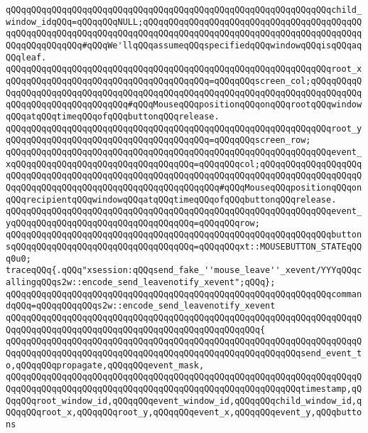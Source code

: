 \verb|qQQqqQQqqQQqqQQqqQQqqQQqqQQqqQQqqQQqqQQqqQQqqQQqqQQqqQQqqQQqqQQqchild_window_idqQQq=qQQqqQQqNULL;qQQqqQQqqQQqqQQqqQQqqQQqqQQqqQQqqQQqqQQqqQQqqQQqqQQqqQQqqQQqqQQqqQQqqQQqqQQqqQQqqQQqqQQqqQQqqQQqqQQqqQQqqQQqqQQqqQQqqQQqqQQqqQQq#qQQqWe'llqQQqassumeqQQqspecifiedqQQqwindowqQQqisqQQqaqQQqleaf.|\newline
\verb|qQQqqQQqqQQqqQQqqQQqqQQqqQQqqQQqqQQqqQQqqQQqqQQqqQQqqQQqqQQqqQQqroot_xqQQqqQQqqQQqqQQqqQQqqQQqqQQqqQQqqQQqqQQq=qQQqqQQqscreen_col;qQQqqQQqqQQqqQQqqQQqqQQqqQQqqQQqqQQqqQQqqQQqqQQqqQQqqQQqqQQqqQQqqQQqqQQqqQQqqQQqqQQqqQQqqQQqqQQqqQQqqQQq#qQQqMouseqQQqpositionqQQqonqQQqrootqQQqwindowqQQqatqQQqtimeqQQqofqQQqbuttonqQQqrelease.|\newline
\verb|qQQqqQQqqQQqqQQqqQQqqQQqqQQqqQQqqQQqqQQqqQQqqQQqqQQqqQQqqQQqqQQqroot_yqQQqqQQqqQQqqQQqqQQqqQQqqQQqqQQqqQQqqQQq=qQQqqQQqscreen_row;|\newline
\verb|qQQqqQQqqQQqqQQqqQQqqQQqqQQqqQQqqQQqqQQqqQQqqQQqqQQqqQQqqQQqqQQqevent_xqQQqqQQqqQQqqQQqqQQqqQQqqQQqqQQqqQQq=qQQqqQQqcol;qQQqqQQqqQQqqQQqqQQqqQQqqQQqqQQqqQQqqQQqqQQqqQQqqQQqqQQqqQQqqQQqqQQqqQQqqQQqqQQqqQQqqQQqqQQqqQQqqQQqqQQqqQQqqQQqqQQqqQQqqQQqqQQqqQQq#qQQqMouseqQQqpositionqQQqonqQQqrecipientqQQqwindowqQQqatqQQqtimeqQQqofqQQqbuttonqQQqrelease.|\newline
\verb|qQQqqQQqqQQqqQQqqQQqqQQqqQQqqQQqqQQqqQQqqQQqqQQqqQQqqQQqqQQqqQQqevent_yqQQqqQQqqQQqqQQqqQQqqQQqqQQqqQQqqQQq=qQQqqQQqrow;|\newline
\verb|qQQqqQQqqQQqqQQqqQQqqQQqqQQqqQQqqQQqqQQqqQQqqQQqqQQqqQQqqQQqqQQqbuttonsqQQqqQQqqQQqqQQqqQQqqQQqqQQqqQQqqQQq=qQQqqQQqxt::MOUSEBUTTON_STATEqQQq0u0;|\newline
\newline
\verb|traceqQQq{.qQQq"xsession:qQQqsend_fake_''mouse_leave''_xevent/YYYqQQqcallingqQQqs2w::encode_send_leavenotify_xevent";qQQq};|\newline
\verb|qQQqqQQqqQQqqQQqqQQqqQQqqQQqqQQqqQQqqQQqqQQqqQQqqQQqqQQqqQQqqQQqcommandqQQq=qQQqqQQqqQQqs2w::encode_send_leavenotify_xevent|\newline
\verb|qQQqqQQqqQQqqQQqqQQqqQQqqQQqqQQqqQQqqQQqqQQqqQQqqQQqqQQqqQQqqQQqqQQqqQQqqQQqqQQqqQQqqQQqqQQqqQQqqQQqqQQqqQQqqQQqqQQqqQQq{|\newline
\verb|qQQqqQQqqQQqqQQqqQQqqQQqqQQqqQQqqQQqqQQqqQQqqQQqqQQqqQQqqQQqqQQqqQQqqQQqqQQqqQQqqQQqqQQqqQQqqQQqqQQqqQQqqQQqqQQqqQQqqQQqqQQqqQQqsend_event_to,qQQqqQQqpropagate,qQQqqQQqevent_mask,|\newline
\verb|qQQqqQQqqQQqqQQqqQQqqQQqqQQqqQQqqQQqqQQqqQQqqQQqqQQqqQQqqQQqqQQqqQQqqQQqqQQqqQQqqQQqqQQqqQQqqQQqqQQqqQQqqQQqqQQqqQQqqQQqqQQqqQQqtimestamp,qQQqqQQqroot_window_id,qQQqqQQqevent_window_id,qQQqqQQqchild_window_id,qQQqqQQqroot_x,qQQqqQQqroot_y,qQQqqQQqevent_x,qQQqqQQqevent_y,qQQqbuttons|\newline
